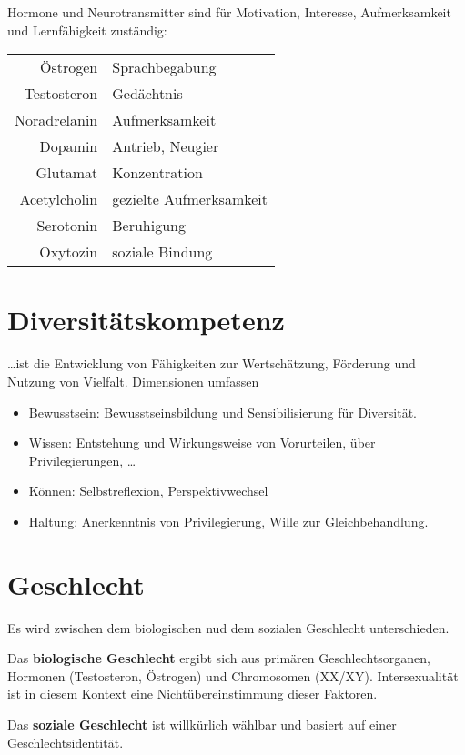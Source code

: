 \documentclass[twocolumn]{article}
\newcommand{\term}[1]{\textbf{#1}}
\begin{document}
Hormone und Neurotransmitter sind für Motivation, Interesse, Aufmerksamkeit und Lernfähigkeit zuständig:

\begin{center}
    \begin{tabular}{r l}
        Östrogen & Sprachbegabung \\
        Testosteron & Gedächtnis \\
        Noradrelanin & Aufmerksamkeit \\
        Dopamin & Antrieb, Neugier \\
        Glutamat & Konzentration \\
        Acetylcholin & gezielte Aufmerksamkeit \\
        Serotonin & Beruhigung \\
        Oxytozin & soziale Bindung
    \end{tabular}
\end{center}

\section{Diversitätskompetenz}

\ldots ist die Entwicklung von Fähigkeiten zur Wert\-schätzung, Förderung und Nutzung von Vielfalt. Dimensionen umfassen
\begin{itemize}
    \item Bewusstsein: Bewusstseinsbildung und Sensibilisierung für Diversität.
    \item Wissen: Entstehung und Wirkungsweise von Vorurteilen, über Privilegierungen, \ldots
    \item Können: Selbstreflexion, Perspektivwechsel
    \item Haltung: Anerkenntnis von Privilegierung, Wille zur Gleichbehandlung.
\end{itemize}

\section{Geschlecht}

Es wird zwischen dem biologischen nud dem sozialen Geschlecht unterschieden.

Das \term{biologische Geschlecht} ergibt sich aus pri\-mären Geschlechtsorganen, Hormonen (Testosteron, Östrogen) und Chromosomen (XX/XY). Intersexualität ist in diesem Kontext eine Nichtübereinstimmung dieser Faktoren.

Das \term{soziale Geschlecht} ist willkürlich wählbar und basiert auf einer Geschlechtsidentität.
\end{document}
